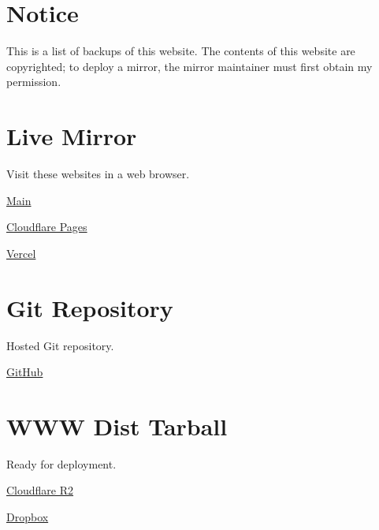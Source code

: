 




\section*{Notice}

This is a list of backups of this website.
The contents of this website are copyrighted; to deploy a mirror, the mirror maintainer must first obtain my permission.

\section*{Live Mirror}

Visit these websites in a web browser.

\begin{compactitem}
    \item \href{https://neruthes.xyz/}{Main}
    \item \href{https://neruthes.pages.dev/}{Cloudflare Pages}
    \item \href{https://neruthes.vercel.app/}{Vercel}
\end{compactitem}

\section*{Git Repository}

Hosted Git repository.

\begin{compactitem}
    \item \href{https://github.com/neruthes/homepage-gen3}{GitHub}
\end{compactitem}

\section*{WWW Dist Tarball}

Ready for deployment.

\begin{compactitem}
    \item \href{https://pub-714f8d634e8f451d9f2fe91a4debfa23.r2.dev/keep/homepage-gen3/wwwdist.tar--00ef643fb4afb6610f3adbbb0ac4fc7c.tar}{Cloudflare R2}
    \item \href{https://www.dropbox.com/s/x7qxeceaaytbkui/wwwdist.tar?dl=0}{Dropbox}
\end{compactitem}

